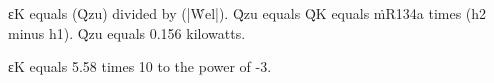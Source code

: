 εK equals (Q̇zu) divided by (|Ẇel|).  
Q̇zu equals Q̇K equals ṁR134a times (h2 minus h1).  
Q̇zu equals 0.156 kilowatts.  

εK equals 5.58 times 10 to the power of -3.